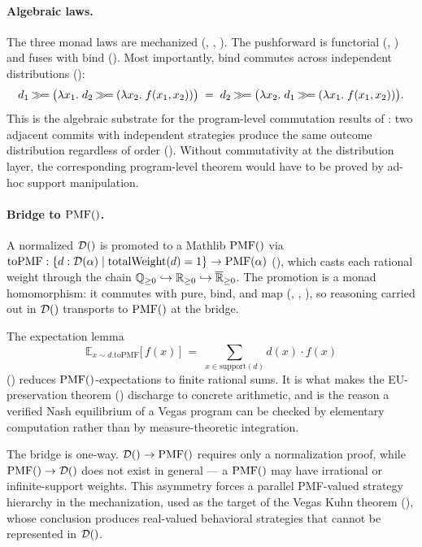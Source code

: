 \documentclass[11pt]{article}
\begin{document}
\paragraph{Algebraic laws.}
The three monad laws are mechanized
(, , ).
The pushforward is functorial (, )
and fuses with $\mathrm{bind}$ (). Most importantly,
$\mathrm{bind}$ commutes across independent distributions
():
\[
  d_1 \mathbin{\gg\!=} \bigl(\lambda x_1.\; d_2 \mathbin{\gg\!=}
    (\lambda x_2.\; f(x_1, x_2))\bigr)
  \;=\;
  d_2 \mathbin{\gg\!=} \bigl(\lambda x_2.\; d_1 \mathbin{\gg\!=}
    (\lambda x_1.\; f(x_1, x_2))\bigr).
\]
This is the algebraic substrate for the program-level commutation
results of : two adjacent commits with independent
strategies produce the same outcome distribution regardless of order
(). Without commutativity at the
distribution layer, the corresponding program-level theorem would
have to be proved by ad-hoc support manipulation.

\paragraph{Bridge to $\mathrm{PMF}()$.}
A normalized $\mathcal{D}()$ is promoted to a Mathlib $\mathrm{PMF}()$ via
$\mathrm{toPMF} : \{d : \mathcal{D}(\alpha) \mid \mathrm{totalWeight}(d) = 1\}
\to \mathrm{PMF}(\alpha)$ (), which casts each rational weight
through the chain $\mathbb{Q}_{\ge 0} \hookrightarrow \mathbb{R}_{\ge 0}
\hookrightarrow \overline{\mathbb{R}}_{\ge 0}$. The promotion is a
monad homomorphism: it commutes with $\mathrm{pure}$, $\mathrm{bind}$,
and $\mathrm{map}$ (, ,
), so reasoning carried out in $\mathcal{D}()$ transports
to $\mathrm{PMF}()$ at the bridge.

The expectation lemma
\[
  \mathbb{E}_{x \sim d.\mathrm{toPMF}}\bigl[\,f(x)\,\bigr]
  \;=\;
  \sum_{x \in \mathrm{support}(d)} d(x) \cdot f(x)
\]
() reduces $\mathrm{PMF}()$-expectations to
finite rational sums. It is what makes the EU-preservation theorem
() discharge to concrete arithmetic, and is the reason a
verified Nash equilibrium of a Vegas program can be checked by
elementary computation rather than by measure-theoretic integration.

The bridge is one-way. $\mathcal{D}() \to \mathrm{PMF}()$ requires only a
normalization proof, while $\mathrm{PMF}() \to \mathcal{D}()$ does not exist in
general --- a $\mathrm{PMF}()$ may have irrational or infinite-support
weights. This asymmetry forces a parallel PMF-valued strategy
hierarchy in the mechanization, used as the target of the Vegas Kuhn
theorem (), whose conclusion produces real-valued
behavioral strategies that cannot be represented in $\mathcal{D}()$.
\end{document}

